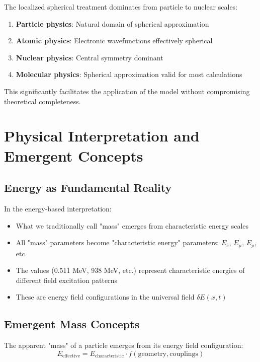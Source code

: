 \documentclass[12pt,a4paper]{report}
\begin{document}
	The localized spherical treatment dominates from particle to nuclear scales:
	\begin{enumerate}
		\item \textbf{Particle physics}: Natural domain of spherical approximation
		\item \textbf{Atomic physics}: Electronic wavefunctions effectively spherical
		\item \textbf{Nuclear physics}: Central symmetry dominant
		\item \textbf{Molecular physics}: Spherical approximation valid for most calculations
	\end{enumerate}
	
	This significantly facilitates the application of the model without compromising theoretical completeness.
	
	\section{Physical Interpretation and Emergent Concepts}
	\label{sec:physical_interpretation}
	
	\subsection{Energy as Fundamental Reality}
	\label{subsec:energy_fundamental}
	
	In the energy-based interpretation:
	\begin{itemize}
		\item What we traditionally call "mass" emerges from characteristic energy scales
		\item All "mass" parameters become "characteristic energy" parameters: $E_e$, $E_\mu$, $E_p$, etc.
		\item The values (0.511 MeV, 938 MeV, etc.) represent characteristic energies of different field excitation patterns
		\item These are energy field configurations in the universal field $\delta E(x,t)$
	\end{itemize}
	
	\subsection{Emergent Mass Concepts}
	\label{subsec:emergent_mass}
	
	The apparent "mass" of a particle emerges from its energy field configuration:
	\begin{equation}
		E_{\text{effective}} = E_{\text{characteristic}} \cdot f(\text{geometry}, \text{couplings})
	\end{equation}
	
\end{document}
